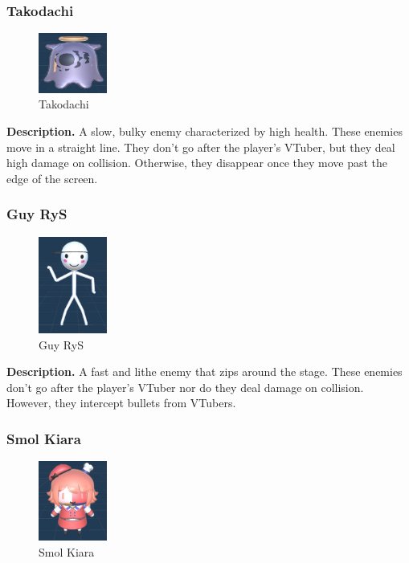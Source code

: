 \documentclass[10pt, a4paper]{article}
\begin{document}
\begin{multicols}{2}
	\subsubsection{Takodachi}

	\begin{figure}[H]
		\centering
		\includegraphics[width=0.2\textwidth]{images/takodachi1.png}
		\caption{Takodachi}
		\label{fig:takodachi}
	\end{figure}

	\textbf{Description.} A slow, bulky enemy characterized by high health. These enemies move in a straight line. They don't go after the player's VTuber, but they deal high damage on collision. Otherwise, they disappear once they move past the edge of the screen.

	\subsubsection{Guy RyS}

	\begin{figure}[H]
		\centering
		\includegraphics[width=0.2\textwidth]{images/guy_rys1.png}
		\caption{Guy RyS}
		\label{fig:guyrys}
	\end{figure}

	\textbf{Description.} A fast and lithe enemy that zips around the stage. These enemies don't go after the player's VTuber nor do they deal damage on collision. However, they intercept bullets from VTubers.

	\subsubsection{Smol Kiara}

	\begin{figure}[H]
		\centering
		\includegraphics[width=0.2\textwidth]{images/smol_kiara1.png}
		\caption{Smol Kiara}
		\label{fig:smolkiara}
	\end{figure}


\end{multicols}
\end{document}
